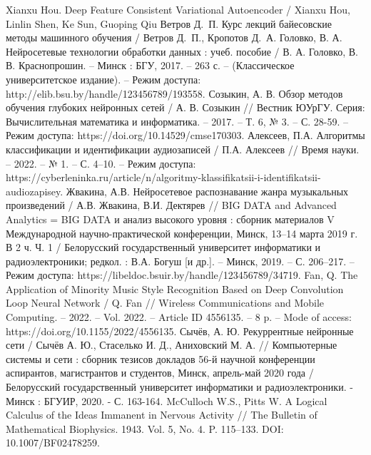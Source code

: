 \begin{thebibliography}{99}
 Xianxu Hou. Deep Feature Consistent Variational Autoencoder / Xianxu Hou, Linlin Shen, Ke Sun, Guoping Qiu
 Ветров Д.~П. Курс лекций байесовские методы машинного обучения / Ветров Д.~П., Кропотов Д.~А.
 Головко, В. А. Нейросетевые технологии обработки данных : учеб. пособие / В. А. Головко, В. В. Краснопрошин. – Минск : БГУ, 2017. – 263 с. – (Классическое университетское издание). – Режим доступа: http://elib.bsu.by/handle/123456789/193558.
 Созыкин, А. В. Обзор методов обучения глубоких нейронных сетей / А. В. Созыкин // Вестник ЮУрГУ. Серия: Вычислительная математика и информатика. – 2017. – Т. 6, № 3. – С. 28-59. – Режим доступа: https://doi.org/10.14529/cmse170303.
 Алексеев, П.А. Алгоритмы классификации и идентификации аудиозаписей / П.А. Алексеев // Время науки. – 2022. – № 1. – С. 4–10. – Режим доступа: https://cyberleninka.ru/article/n/algoritmy-klassifikatsii-i-identifikatsii-audiozapisey.
 Жвакина, А.В. Нейросетевое распознавание жанра музыкальных произведений / А.В.  Жвакина, В.И. Дектярев // BIG DATA and Advanced Analytics = BIG DATA и анализ высокого уровня : сборник материалов V Международной научно-практической конференции, Минск, 13–14 марта 2019 г. В 2 ч. Ч. 1 / Белорусский государственный университет информатики и радиоэлектроники; редкол. : В.А. Богуш [и др.]. – Минск, 2019. – С. 206–217. – Режим доступа: https://libeldoc.bsuir.by/handle/123456789/34719.
 Fan, Q. The Application of Minority Music Style Recognition Based on Deep Convolution Loop Neural Network / Q. Fan // Wireless Communications and Mobile Computing. – 2022. – Vol. 2022. – Article ID 4556135. – 8 p. – Mode of access: https://doi.org/10.1155/2022/4556135.
 Сычёв, А. Ю. Рекуррентные нейронные сети / Сычёв А. Ю., Стаселько И. Д., Аниховский М. А. // Компьютерные системы и сети : сборник тезисов докладов 56-й научной конференции аспирантов, магистрантов и студентов, Минск, апрель-май 2020 года / Белорусский государственный университет информатики и радиоэлектроники. - Минск : БГУИР, 2020. - С. 163-164.
 McCulloch W.S., Pitts W. A Logical Calculus of the Ideas Immanent in Nervous Activity // The Bulletin of Mathematical Biophysics. 1943. Vol. 5, No. 4. P. 115–133.  DOI: 10.1007/BF02478259.

\end{thebibliography}
